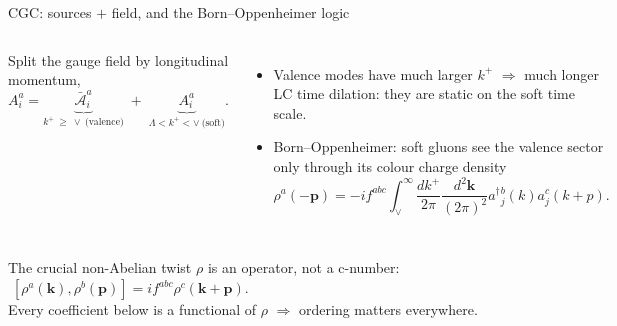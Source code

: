 \documentclass[9pt,aspectratio=169]{beamer}
\newcommand{\hl}[1]{\textcolor{acc}{#1}}
\newcommand{\hb}[1]{\textcolor{blu}{#1}}
\newcommand{\kp}{k^{+}}
\newcommand{\ad}{a^{\dagger}}
\begin{document}
\begin{frame}{CGC: sources $+$ field, and the Born--Oppenheimer logic}
\begin{columns}[T,onlytextwidth]
Split the gauge field by longitudinal momentum,
\[
A^{a}_{i}=\underbrace{\bar{\mathcal A}^{a}_{i}}_{\kp\ \ge\ \vee\ \text{(valence)}}
\;+\;\underbrace{A^{a}_{i}}_{\Lambda<\kp<\vee\ \text{(soft)}} .
\]
\begin{itemize}
  \item Valence modes have much larger $\kp$ $\Rightarrow$ much \hl{longer} LC time dilation:
        they are \hb{static} on the soft time scale.
  \item Born--Oppenheimer: soft gluons see the valence sector only through its
        \hl{colour charge density}
  \[
   \rho^{a}(-\bm p)=-if^{abc}\!\!\int_{\vee}^{\infty}\!\!\frac{d\kp}{2\pi}\frac{d^2\bm k}{(2\pi)^2}
   \ad{}^{b}_{j}(k)a^{c}_{j}(k+p).
  \]
\end{itemize}
\begin{center}
\end{center}
\end{columns}
\medskip
\begin{alertblock}{The crucial non-Abelian twist}
$\rho$ is an \hl{operator}, not a c-number:
$\;[\rho^{a}(\bm k),\rho^{b}(\bm p)]=if^{abc}\rho^{c}(\bm k+\bm p)$.\\
Every coefficient below is a functional of $\rho$ $\Rightarrow$ \hb{ordering matters everywhere}.
\end{alertblock}
\end{frame}
\end{document}
